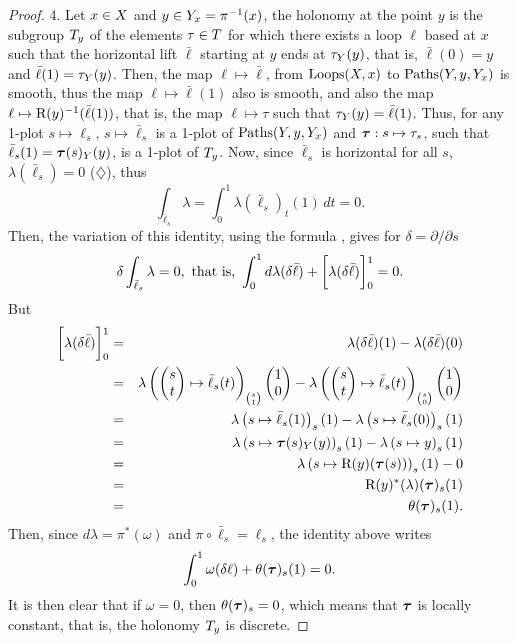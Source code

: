 \begin{proof}
  4. Let $x \in X$ and $y \in Y_x = \pi^{-1}(x)$,
  the holonomy at the point $y$ is the subgroup $T_y$ of the elements $\tau \in T$ for which there exists a loop $\ell$ based at $x$ such that the horizontal lift $\bar\ell$ starting at $y$ ends at $\tau_Y(y)$,
  that is,
  $\bar\ell(0) = y$ and $\bar\ell(1) = \tau_Y(y)$.
  Then,
  the map $\ell \mapsto \bar\ell$,
  from $\operatorname{Loops}(X,x)$ to $\operatorname{Paths}(Y,y,Y_x)$ is smooth,
  thus the map $\ell \mapsto \bar\ell(1)$ also is smooth,
  and also the map $\ell \mapsto \mathrm{R}(y)^{-1}(\bar\ell(1))$,
  that is,
  the map $\ell \mapsto \tau$ such that $\tau_Y(y) = \bar\ell(1)$.
  Thus,
  for any 1-plot $s \mapsto \ell_s$,
  $s \mapsto \bar\ell_s$ is a 1-plot of $\operatorname{Paths}(Y,y,Y_x)$ and $\boldsymbol \tau : s \mapsto \tau_s$,
  such that $\bar\ell_s(1) = \boldsymbol \tau(s)_Y(y)$, is a 1-plot of $T_y$.
  Now,
  since $\bar\ell_s$ is horizontal for all $s$,
  $\lambda(\bar\ell_s) = 0$ ($\diamondsuit$),
  thus
  $$%
  \int_{\bar\ell_s} \lambda = \int_0^1 \lambda(\bar\ell_s)_t(1) \, dt =0.
  $$%
  Then,
  the variation of this identity, using the formula ,
  gives for $\delta = \partial/\partial s$
  $$%
  \delta \int_{\bar\ell_s} \lambda = 0, \ \text{that is,} \ \int_0^1 d\lambda(\delta \bar\ell) + \limitbrackets{\lambda(\delta\bar\ell)}{0}{1} = 0.
  $$%
  But
  \begin{eqnarray*}
    \limitbrackets{\lambda(\delta\bar\ell)}{0}{1} & = & \lambda(\delta\bar\ell)(1) - \lambda(\delta\bar\ell)(0) \\
    & = &
    \lambda\left(\vect{s \\ t} \mapsto \bar\ell_s(t)\right)_{s \choose 1}\vect{1 \\ 0}
    - \lambda\left(\vect{s \\ t} \mapsto \bar\ell_s(t)\right)_{s \choose 0}\vect{1 \\ 0} \\
    & = &
    \lambda\left(s \mapsto \bar\ell_s(1)\right)_{s}(1)
    - \lambda\left(s \mapsto \bar\ell_s(0)\right)_{s}(1) \\
    & = &
    \lambda\left(s \mapsto \btau(s)_\Y(y)\right)_{s}(1)
    - \lambda\left(s \mapsto y \right)_{s}(1) \\
    & = &
    \lambda\left(s \mapsto \orb{y}(\btau(s)) \right)_{s}(1)
    - 0 \\
    & = & \orb{y}^*(\lambda)(\btau)_{s}(1)\\
    & = & \theta(\btau)_{s}(1).
  \end{eqnarray*}
  Then,
  since $d\lambda = \pi^*(\omega)$ and $\pi\circ\bar\ell_s = \ell_s$,
  the identity above writes
  $$%
  \int_0^1 \omega(\delta \ell) + \theta(\btau)_{s}(1) = 0.
  $$%
  It is then clear that if $\omega = 0$,
  then $\theta(\boldsymbol \tau)_{s} = 0$,
  which means that $\boldsymbol \tau$ is locally constant,
  that is,
  the holonomy $T_y$ is discrete.
\end{proof}

